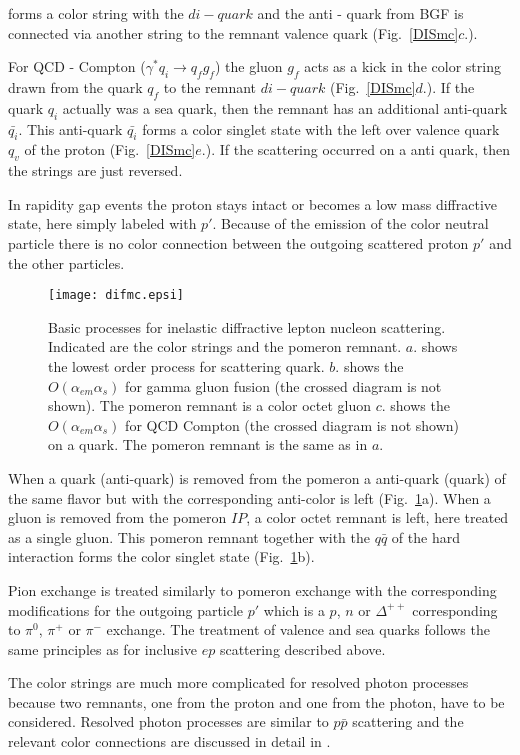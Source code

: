 \documentclass[10pt]{article} \usepackage{dina4}
\newcommand{\PO}{\ensuremath{ I\! \! P} }
\begin{document}
forms a color string with the $di - quark$ and the anti - quark from
BGF is connected via another string 
to the remnant valence quark (Fig.~\ref{DISmc}$c$.).
\par 
For QCD - Compton ($\gamma^* q_i \to q_f g_f$) the gluon $g_f$ acts as a kick 
in the color string drawn from the quark $q_f$ to the remnant $di - quark$
(Fig.~\ref{DISmc}$d$.).
If the quark $q_i$ actually was a sea quark, then the remnant has 
an additional anti-quark $\bar{q_i}$. This anti-quark 
$\bar{q_i}$ forms a color singlet state with the left over 
valence quark $q_v$ of the proton (Fig.~\ref{DISmc}$e$.). If the 
scattering occurred on a anti quark, then the strings are just reversed.
\par
In rapidity gap events the proton stays intact or becomes a low
mass diffractive state, here simply labeled with $p'$.
 Because of the emission of the
color neutral particle there is
no color connection between  the outgoing scattered proton $p'$
and the other particles.
\begin{figure}[ht]
\begin{center}
\centerline{\texttt{[image: difmc.epsi]}}
\end{center}
\caption{Basic processes for inelastic diffractive 
lepton nucleon scattering.
Indicated are the color strings and the pomeron remnant.
$a$. shows the lowest order process for scattering quark.
$b$. shows the
$O(\alpha _{em}\alpha_s)$
for gamma gluon fusion (the crossed diagram is not shown).
 The pomeron remnant is a color octet gluon
 $c$. shows the
$O(\alpha _{em}\alpha_s)$
for QCD Compton (the crossed diagram is not shown) on a quark.
 The pomeron remnant is the same as in $a$.
\label{difmc}}
\end{figure}
When a quark (anti-quark) is removed from the  pomeron 
a anti-quark (quark) of the same flavor but with the corresponding anti-color
is left (Fig.~\ref{difmc}a). 
 When a gluon is removed from the
 pomeron $\PO$, a color octet remnant is left,  here
treated as a
single gluon. This pomeron remnant together with the $q\bar{q}$
of the hard interaction forms the color singlet state
(Fig.~\ref{difmc}b).
\par
Pion exchange is treated similarly to pomeron exchange with the 
corresponding modifications for the outgoing particle $p'$
which is a $p$, $n$ or $\Delta^{++}$  corresponding to 
$\pi^0$, $\pi^+$ or $\pi^-$ exchange. The treatment of valence and sea 
quarks follows the same principles as for inclusive $ep$ scattering described
above.
\par
The color strings are much more complicated for resolved photon processes 
because two remnants, one from the proton and one from the photon, have to
be considered. Resolved photon processes are similar to $p\bar{p}$ 
scattering and the relevant color connections are discussed in detail in
\cite{PYTHIA_ppbar_color}.
\end{document}
